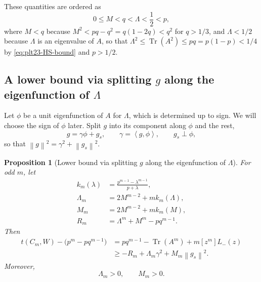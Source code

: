 ﻿\documentclass[11pt]{article}
\newtheorem{proposition}[theorem]{Proposition}
\numberwithin{equation}{section}
\newcommand{\ip}[2]{\left\langle #1,#2\right\rangle}
\newcommand{\norm}[1]{\left\lVert #1\right\rVert}
\newcommand{\Tr}{\operatorname{Tr}}
\begin{document}
These quantities are ordered as
\begin{equation}\label{eq:plt23-M-Lambda-order}
  0\le M<q<\Lambda<\frac{1}{2}<p,
\end{equation}
where $M<q$ because $M^2<pq-q^2=q(1-2q)<q^2$ for $q>1/3$, and $\Lambda<1/2$ because $\Lambda$ is an eigenvalue of $A$, so that $\Lambda^2\le\Tr(A^2)\le pq=p(1-p)<1/4$ by \eqref{eq:plt23-HS-bound} and $p>1/2$.

\subsection{A lower bound via splitting \texorpdfstring{$g$}{g} along the
eigenfunction of \texorpdfstring{$\Lambda$}{Lambda}}\label{subsec:plt23-splitting-lower-bound}

Let $\phi$ be a unit eigenfunction of $A$ for $\Lambda$, which is determined up to sign.
We will choose the sign of $\phi$ later.
Split $g$ into its component along $\phi$ and the rest,
\begin{equation}\label{eq:plt23-g-decomp}
  g=\gamma\phi+g_s,
  \qquad \gamma=\ip g\phi,
  \qquad g_s\perp\phi,
\end{equation}
so that $\norm g^2=\gamma^2+\norm{g_s}^2$.

\begin{proposition}[Lower bound via splitting $g$ along the eigenfunction of $\Lambda$]\label{prop:plt23-splitting-lower-bound}
  For odd $m$, let
  \begin{align}
    k_m(\lambda)&=\frac{p^{m-1}-\lambda^{m-1}}{p+\lambda},
    \label{eq:plt23-km-def}\\
    \Lambda_m&=2M^{m-2}+mk_m(\Lambda),\label{eq:plt23-Lambdam-def}\\
    M_m&=2M^{m-2}+mk_m(M),\label{eq:plt23-Mm-def}\\
    R_m&=\Lambda^m+M^m-pq^{m-1}.\label{eq:plt23-Rm-def}
  \end{align}
  Then
  \begin{align}
    t(C_m,W)-\bigl(p^m-pq^{m-1}\bigr)
    &= pq^{m-1} - \Tr(A^m)+m[z^m]L_-(z) \nonumber
    \\
    {} &\ge -R_m+\Lambda_m\gamma^2+M_m\norm{g_s}^2.\label{eq:plt23-splitting-lower-bound}
  \end{align}
  Moreover,
  \begin{equation}\label{eq:plt23-Lambdam-Mm-positive}
    \Lambda_m>0,
    \qquad
    M_m>0.
  \end{equation}
\end{proposition}
\end{document}
